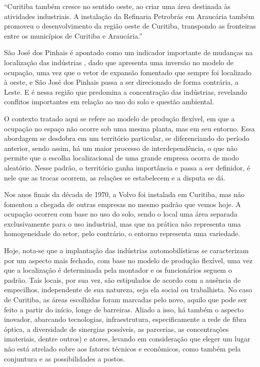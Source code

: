 	\begin{citacao}
		``Curitiba também cresce no sentido oeste, ao criar uma área destinada às atividades industriais. A instalação da Refinaria Petrobrás em Araucária também promoveu o desenvolvimento da região oeste de Curitiba, transpondo as fronteiras entre os municípios de Curitiba e Araucária.''
	\end{citacao}
	
	São José dos Pinhais é apontado como um indicador importante de mudanças na localização das indústrias \cite{firkowski2002b}, dado que apresenta uma inversão no modelo de ocupação, uma vez que o vetor de expansão fomentado que sempre foi localizado à oeste, e São José dos Pinhais passa a ser direcionado de forma contrária, a Leste. E é nessa região que predomina a concentração das indústrias, revelando conflitos importantes em relação ao uso do solo e questão ambiental.

	O contexto tratado aqui se refere ao modelo de produção flexível, em que a ocupação no espaço não ocorre sob uma mesma planta, mas em seu entorno. Essa abordagem se desdobra em um território particular, se diferenciando do período anterior, sendo assim, há um maior processo de interdependência, o que não permite que a escolha localizacional de uma grande empresa ocorra de modo aleatório. Nesse padrão, o território ganha importância e passa a ser definidor, é nele que as trocas ocorrem, as relações se estabelecem e a disputa se dá. 
	
	Nos anos finais da década de 1970, a Volvo foi instalada em Curitiba, mas não fomentou a chegada de outras empresas no mesmo padrão que vemos hoje. A ocupação ocorreu com base no uso do solo, sendo o local uma área separada exclusivamente para o uso industrial, mas que na prática não representa uma homogeneidade do setor, pelo contrário, o entorno representa uma variedade.
	
	Hoje, nota-se que a implantação das indústrias automobilísticas se caracterizam por um aspecto mais fechado, com base no modelo de produção flexível, uma vez que a localização é determinada pela montador e os funcionários seguem o padrão. Tais locais, por sua vez, são estipulados de acordo com a ausência de empecilhos, independente de sua natureza, seja ela social ou trabalhista. No caso de Curitiba, as áreas escolhidas foram marcadas pelo novo, aquilo que pode ser feito a partir do início, longe de barreiras. Aliado a isso, há também o aspecto inovador, abarcando tecnologias, infraestrutura, especificamente a rede de fibra óptica, a diversidade de sinergias possíveis, as parcerias, as concentrações imateriais, dentre outros) e atores, levando em consideração que eleger um lugar não está atrelado sobre aos fatores técnicos e econômicos, como também pela conjuntura e as possibilidades a postos.

